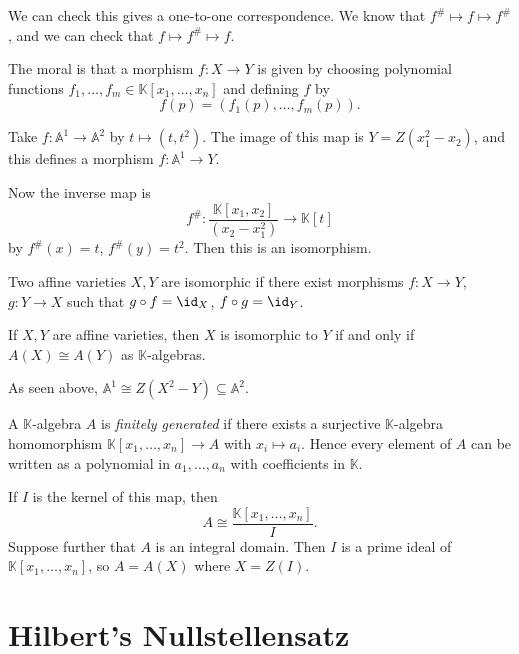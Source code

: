 \documentclass[12pt]{article}
\begin{document}
We can check this gives a one-to-one correspondence. We know that $f^{\#} \mapsto f \mapsto f^{\#}$, and we can check that $f \mapsto f^{\#} \mapsto f$.

The moral is that a morphism $f : X \to Y$ is given by choosing polynomial functions $f_1, \ldots, f_m \in \mathbb{K}[x_1, \ldots, x_n]$ and defining $f$ by
\[
f(p) = (f_1(p), \ldots, f_m(p)).
\]

\begin{exbox}
	Take $f : \mathbb{A}^1 \to \mathbb{A}^2$ by $t \mapsto (t, t^2)$. The image of this map is $Y = Z(x_1^2 - x_2)$, and this defines a morphism $f : \mathbb{A}^1 \to Y$.

	Now the inverse map is
	\[
		f^{\#} : \frac{\mathbb{K}[x_1, x_2]}{(x_2 - x_1^2)} \to \mathbb{K}[t]
	\]
	by $f^{\#}(x) = t$, $f^{\#}(y) = t^2$. Then this is an isomorphism.
\end{exbox}

\begin{definition}
	Two affine varieties $X, Y$ are isomorphic if there exist morphisms $f : X \to Y$, $g : Y \to X$ such that $g \circ f = \id_X$, $f \circ g = \id_Y$.
\end{definition}

\begin{theorem}
	If $X, Y$ are affine varieties, then $X$ is isomorphic to $Y$ if and only if $A(X) \cong A(Y)$ as $\mathbb{K}$-algebras.
\end{theorem}

As seen above, $\mathbb{A}^1 \cong Z(X^2 - Y) \subseteq \mathbb{A}^2$.

\begin{remark}
	A $\mathbb{K}$-algebra $A$ is \emph{finitely generated} if there exists a surjective $\mathbb{K}$-algebra homomorphism $\mathbb{K}[x_1, \ldots, x_n] \to A$ with $x_i \mapsto a_i$. Hence every element of $A$ can be written as a polynomial in $a_1, \ldots, a_n$ with coefficients in $\mathbb{K}$.

	If $I$ is the kernel of this map, then
	\[
		A \cong \frac{\mathbb{K}[x_1, \ldots, x_n]}{I}.
	\]
	Suppose further that $A$ is an integral domain. Then $I$ is a prime ideal of $\mathbb{K}[x_1, \ldots, x_n]$, so $A = A(X)$ where $X = Z(I)$.
\end{remark}

\newpage

\section{Hilbert's Nullstellensatz}
\label{sec:hil_null}
\end{document}
